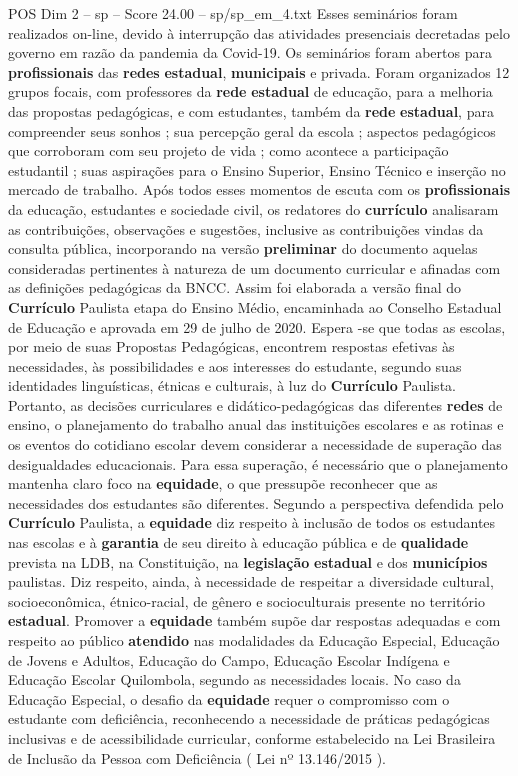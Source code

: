 \begin{textsample}{POS Dim 2 – sp – Score 24.00 – sp/sp\_em\_4.txt}
Esses seminários foram realizados on-line, devido à interrupção das atividades presenciais decretadas pelo governo em razão da pandemia da Covid-19.
Os seminários foram abertos para \textbf{profissionais} das \textbf{redes} \textbf{estadual}, \textbf{municipais} e privada.
Foram organizados 12 grupos focais, com professores da \textbf{rede} \textbf{estadual} de educação, para a melhoria das propostas pedagógicas, e com estudantes, também da \textbf{rede} \textbf{estadual}, para compreender seus sonhos ; sua percepção geral da escola ; aspectos pedagógicos que corroboram com seu projeto de vida ; como acontece a participação estudantil ; suas aspirações para o Ensino Superior, Ensino Técnico e inserção no mercado de trabalho.
Após todos esses momentos de escuta com os \textbf{profissionais} da educação, estudantes e sociedade civil, os redatores do \textbf{currículo} analisaram as contribuições, observações e sugestões, inclusive as contribuições vindas da consulta pública, incorporando na versão \textbf{preliminar} do documento aquelas consideradas pertinentes à natureza de um documento curricular e afinadas com as definições pedagógicas da BNCC.
Assim foi elaborada a versão final do \textbf{Currículo} Paulista etapa do Ensino Médio, encaminhada ao Conselho Estadual de Educação e aprovada em 29 de julho de 2020.
Espera -se que todas as escolas, por meio de suas Propostas Pedagógicas, encontrem respostas efetivas às necessidades, às possibilidades e aos interesses do estudante, segundo suas identidades linguísticas, étnicas e culturais, à luz do \textbf{Currículo} Paulista.
Portanto, as decisões curriculares e didático-pedagógicas das diferentes \textbf{redes} de ensino, o planejamento do trabalho anual das instituições escolares e as rotinas e os eventos do cotidiano escolar devem considerar a necessidade de superação das desigualdades educacionais.
Para essa superação, é necessário que o planejamento mantenha claro foco na \textbf{equidade}, o que pressupõe reconhecer que as necessidades dos estudantes são diferentes.
Segundo a perspectiva defendida pelo \textbf{Currículo} Paulista, a \textbf{equidade} diz respeito à inclusão de todos os estudantes nas escolas e à \textbf{garantia} de seu direito à educação pública e de \textbf{qualidade} prevista na LDB, na Constituição, na \textbf{legislação} \textbf{estadual} e dos \textbf{municípios} paulistas.
Diz respeito, ainda, à necessidade de respeitar a diversidade cultural, socioeconômica, étnico-racial, de gênero e socioculturais presente no território \textbf{estadual}.
Promover a \textbf{equidade} também supõe dar respostas adequadas e com respeito ao público \textbf{atendido} nas modalidades da Educação Especial, Educação de Jovens e Adultos, Educação do Campo, Educação Escolar Indígena e Educação Escolar Quilombola, segundo as necessidades locais.
No caso da Educação Especial, o desafio da \textbf{equidade} requer o compromisso com o estudante com deficiência, reconhecendo a necessidade de práticas pedagógicas inclusivas e de acessibilidade curricular, conforme estabelecido na Lei Brasileira de Inclusão da Pessoa com Deficiência ( Lei nº 13.146/2015 ).


\end{textsample}
